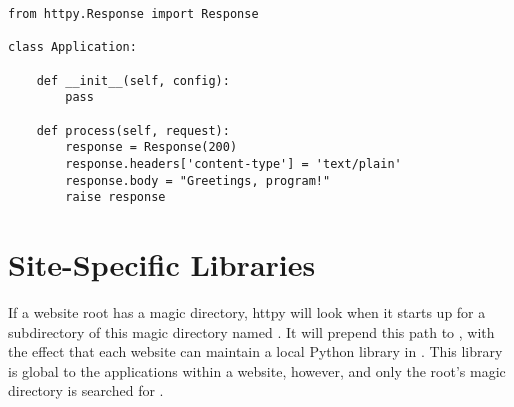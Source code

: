 \begin{verbatim}
from httpy.Response import Response

class Application:

    def __init__(self, config):
        pass

    def process(self, request):
        response = Response(200)
        response.headers['content-type'] = 'text/plain'
        response.body = "Greetings, program!"
        raise response

\end{verbatim}



\section{Site-Specific Libraries}

If a website root has a magic directory, httpy will look when it starts up for a
subdirectory of this magic directory named . It will prepend
this path to , with the effect that each website can maintain a
local Python library in . This library is
global to the applications within a website, however, and only the root's magic
directory is searched for .


